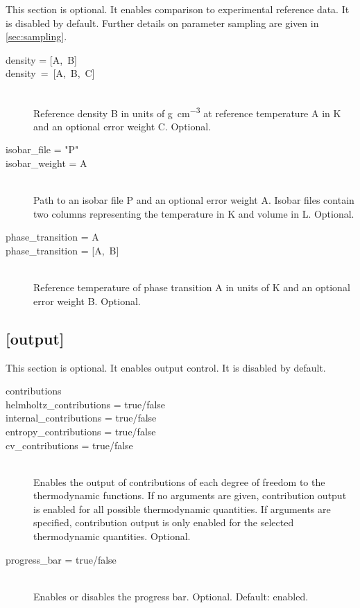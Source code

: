 \documentclass{scrartcl}
\begin{document}
This section is optional.
It enables comparison to experimental reference data.
It is disabled by default.
Further details on parameter sampling are given in \cref{sec:sampling}.

\begin{description}
    \item[density = \mbox{[A, B]}]
    \item[\mbox{density = \mbox{[A, B, C]}}] \hfill \\
        Reference density B in units of \si{\gram\per\cubic\centi\meter} at reference temperature 
        A in \si{\kelvin} and an optional error weight C.
        Optional.
        \vspace{0.1cm}
    \item[isobar\_file  = "P"]
    \item[isobar\_weight = A] \hfill \\
        Path to an isobar file P and an optional error weight A.
        Isobar files contain two columns representing the temperature in \si{\kelvin} and volume 
        in \si{\liter}.
        Optional.
        \vspace{0.1cm}
    \item[phase\_transition = A]
    \item[phase\_transition = \mbox{[A, B]}] \hfill \\
        Reference temperature of phase transition A in units of \si{\kelvin} and an optional error 
        weight B.
        Optional.
\end{description}

\subsection*{[output]}
\vspace{-0.3cm}

This section is optional.
It enables output control.
It is disabled by default.

\begin{description}
    \item[contributions]
    \item[helmholtz\_contributions = true/false] \hfill 
    \item[internal\_contributions = true/false] \hfill 
    \item[entropy\_contributions = true/false] \hfill 
    \item[cv\_contributions = true/false] \hfill \\
        Enables the output of contributions of each degree of freedom to the thermodynamic functions.
        If no arguments are given, contribution output is enabled for all possible thermodynamic quantities.
        If arguments are specified, contribution output is only enabled for the selected thermodynamic quantities.
        Optional.
    \item[progress\_bar = true/false] \hfill \\
        Enables or disables the progress bar.
        Optional. Default: enabled.
\end{description}
\end{document}
